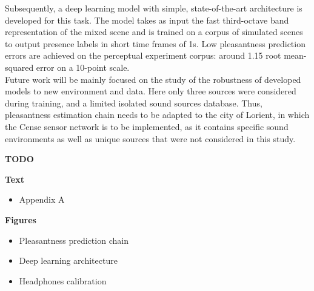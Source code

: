 \documentclass[11pt,a4paper]{article}
\begin{document}
Subsequently, a deep learning model with simple, state-of-the-art architecture is developed for this task. The model takes as input the fast third-octave band representation of the mixed scene and is trained on a corpus of simulated scenes to output presence labels in short time frames of 1s. Low pleasantness prediction errors are achieved on the perceptual experiment corpus: around 1.15 root mean-squared error on a 10-point scale.\\

Future work will be mainly focused on the study of the robustness of developed models to new environment and data. Here only three sources were considered during training, and a limited isolated sound sources database. Thus, pleasantness estimation chain needs to be adapted to the city of Lorient, in which the Cense sensor network is to be implemented, as it contains specific sound environments as well as unique sources that were not considered in this study. 

\clearpage

\textbf{TODO}


\textbf{Text}

\begin{itemize}
\item Appendix A
\end{itemize}

\textbf{Figures}

\begin{itemize}
\item Pleasantness prediction chain
\item Deep learning architecture
\item Headphones calibration
\end{itemize}

\clearpage












\end{document}
